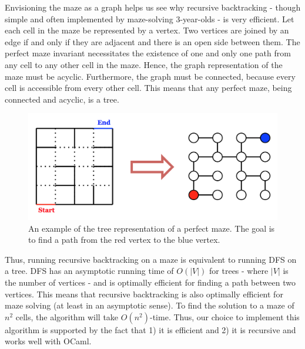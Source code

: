 \documentclass[11pt, margin=1in]{article}
\newcommand{\tab}{\par \qquad}
\newcommand{\card}[1]{\ensuremath{\left\vert#1\right\vert}}
\begin{document}
\tab Envisioning the maze as a graph helps us see why recursive backtracking - though simple and often implemented by maze-solving 3-year-olds - is very efficient.  Let each cell in the maze be represented by a vertex.  Two vertices are joined by an edge if and only if they are adjacent and there is an open side between them.  The perfect maze invariant necessitates the existence of one and only one path from any cell to any other cell in the maze.  Hence, the graph representation of the maze must be acyclic.  Furthermore, the graph must be connected, because every cell is accessible from every other cell.  This means that any perfect maze, being connected and acyclic, is a tree.                  

\begin{figure}[H]
\begin{center}
\includegraphics[scale=0.7]{tree.jpg}
\caption{An example of the tree representation of a perfect maze.  The goal is to find a path from the red vertex to the blue vertex.}
\end{center}
\end{figure}

Thus, running recursive backtracking on a maze is equivalent to running DFS on a tree.  DFS has an asymptotic running time of $O(\card{V})$ for trees - where $\card{V}$ is the number of vertices - and is optimally efficient for finding a path between two vertices.  This means that recursive backtracking is also optimally efficient for maze solving (at least in an asymptotic sense).  To find the solution to a maze of $n^2$ cells, the algorithm will take $O(n^2)$-time.  Thus, our choice to implement this algorithm is supported by the fact that 1) it is efficient and 2) it is recursive and works well with OCaml.      
\end{document}
